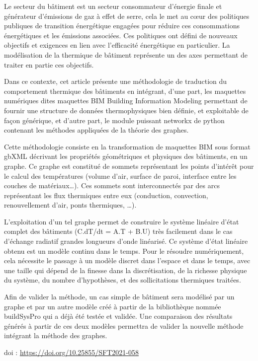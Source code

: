 {\normalsize
Le secteur du bâtiment est un secteur consommateur d'énergie finale et générateur d'émissions de gaz à effet de serre, cela le met au cœur des politiques publiques de transition énergétique engagées pour réduire ces consommations énergétiques et les émissions associées. Ces politiques ont défini de nouveaux objectifs et exigences en lien avec l'efficacité énergétique en particulier. La modélisation de la thermique de bâtiment représente un des axes permettant de traiter en partie ces objectifs.



Dans ce contexte, cet article présente une méthodologie de traduction du comportement thermique des bâtiments en intégrant, d'une part, les maquettes numériques dites maquettes BIM Building Information Modeling permettant de fournir une structure de données thermophysiques bien définie, et exploitable de façon générique, et d'autre part, le module puissant networkx de python contenant les méthodes appliquées de la théorie des graphes.



Cette méthodologie consiste en la transformation de maquettes BIM sous format gbXML décrivant les propriétés géométriques et physiques des bâtiments, en un graphe. Ce graphe est constitué de sommets représentant les points d'intérêt pour le calcul des températures (volume d'air, surface de paroi, interface entre les couches de matériaux…). Ces sommets sont interconnectés par des arcs représentant les flux thermiques entre eux (conduction, convection, renouvellement d'air, ponts thermiques, …).



L'exploitation d'un tel graphe permet de construire le système linéaire d'état complet des bâtiments (C.dT/dt = A.T + B.U) très facilement dans le cas d'échange radiatif grandes longueurs d'onde linéarisé. Ce système d'état linéaire obtenu est un modèle continu dans le temps. Pour le résoudre numériquement, cela nécessite le passage à un modèle discret dans l'espace et dans le temps, avec une taille qui dépend de la finesse dans la discrétisation, de la richesse physique du système, du nombre d'hypothèses, et des sollicitations thermiques traitées.



Afin de valider la méthode, un cas simple de bâtiment sera modélisé par un graphe et par un autre modèle créé à partir de la bibliothèque nommée buildSysPro qui a déjà été testée et validée. Une comparaison des résultats générés à partir de ces deux modèles permettra de valider la nouvelle méthode intégrant la méthode des graphes.

 \vfill doi : \url{https://doi.org/10.25855/SFT2021-058}

}
 
